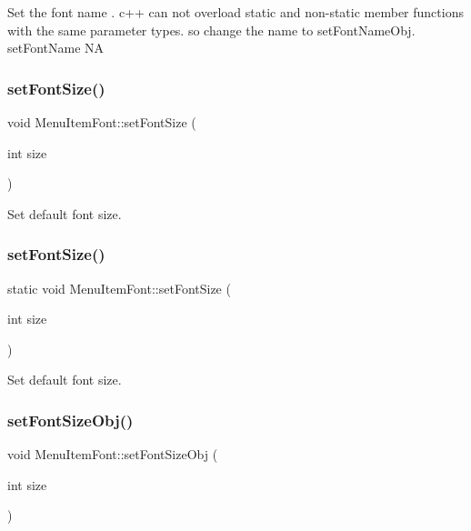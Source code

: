 Set the font name . c++ can not overload static and non-\/static member functions with the same parameter types. so change the name to set\+Font\+Name\+Obj.  set\+Font\+Name  NA \mbox{\label{classMenuItemFont_a7731c16b60705da0b62216cb65e4c9f4}} 
\subsubsection{\texorpdfstring{set\+Font\+Size()}{setFontSize()}\hspace{0.1cm}{\footnotesize\ttfamily [1/2]}}
{\footnotesize\ttfamily void Menu\+Item\+Font\+::set\+Font\+Size (\begin{DoxyParamCaption}\item[{int}]{size }\end{DoxyParamCaption})\hspace{0.3cm}{\ttfamily [static]}}

Set default font size. \mbox{\label{classMenuItemFont_ae322e28b76be4f9c73e24da908c7185b}} 
\subsubsection{\texorpdfstring{set\+Font\+Size()}{setFontSize()}\hspace{0.1cm}{\footnotesize\ttfamily [2/2]}}
{\footnotesize\ttfamily static void Menu\+Item\+Font\+::set\+Font\+Size (\begin{DoxyParamCaption}\item[{int}]{size }\end{DoxyParamCaption})\hspace{0.3cm}{\ttfamily [static]}}

Set default font size. \mbox{\label{classMenuItemFont_aef699c4a066777868fa36c547cb4e62a}} 
\subsubsection{\texorpdfstring{set\+Font\+Size\+Obj()}{setFontSizeObj()}\hspace{0.1cm}{\footnotesize\ttfamily [1/2]}}
{\footnotesize\ttfamily void Menu\+Item\+Font\+::set\+Font\+Size\+Obj (\begin{DoxyParamCaption}\item[{int}]{size }\end{DoxyParamCaption})}

